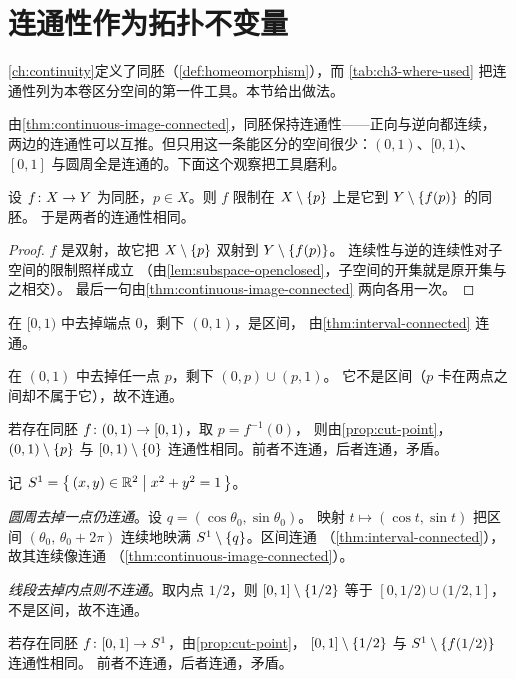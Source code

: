 \section{连通性作为拓扑不变量}
\label{sec:topological-invariant}

\cref{ch:continuity}定义了同胚（\cref{def:homeomorphism}），而%
\cref{tab:ch3-where-used} 把连通性列为本卷区分空间的第一件工具。本节给出做法。

由\cref{thm:continuous-image-connected}，同胚保持连通性——正向与逆向都连续，
两边的连通性可以互推。但只用这一条能区分的空间很少：\((0,1)\)、\([0,1)\)、
\([0,1]\) 与圆周全是连通的。下面这个观察把工具磨利。

\begin{proposition}[割点法]
  \label{prop:cut-point}
  设 \(f \colon X \to Y\) 为同胚，\(p \in X\)。则 \(f\) 限制在
  \(X \setminus \left\{p\right\}\) 上是它到 \(Y \setminus \left\{f(p)\right\}\) 的同胚。
  于是两者的连通性相同。
\end{proposition}

\begin{proof}
  \(f\) 是双射，故它把 \(X \setminus \left\{p\right\}\) 双射到 \(Y \setminus \left\{f(p)\right\}\)。
  连续性与逆的连续性对子空间的限制照样成立
  （由\cref{lem:subspace-openclosed}，子空间的开集就是原开集与之相交）。
  最后一句由\cref{thm:continuous-image-connected} 两向各用一次。
\end{proof}

\begin{example}[{\((0,1)\) 与 \([0,1)\) 不同胚}]
  \label{ex:01-not-homeo}
  \begin{worked}
    在 \([0,1)\) 中去掉端点 \(0\)，剩下 \((0,1)\)，是区间，
    由\cref{thm:interval-connected} 连通。

    在 \((0,1)\) 中去掉任一点 \(p\)，剩下 \((0,p) \cup (p,1)\)。
    它不是区间（\(p\) 卡在两点之间却不属于它），故不连通。

    若存在同胚 \(f \colon (0,1) \to [0,1)\)，取 \(p = f^{-1}(0)\)，
    则由\cref{prop:cut-point}，\((0,1) \setminus \left\{p\right\}\) 与 \([0,1) \setminus \left\{0\right\}\)
    连通性相同。前者不连通，后者连通，矛盾。
  \end{worked}
\end{example}

\begin{example}[{\([0,1]\) 与圆周不同胚}]
  \label{ex:circle-not-homeo}
  记 \(S^{1} = \left\{\,(x,y) \in \mathbb{R}^{2} \;\middle|\; x^{2}+y^{2}=1\,\right\}\)。
  \begin{worked}
    \emph{圆周去掉一点仍连通}。设 \(q = (\cos\theta_{0},\sin\theta_{0})\)。
    映射 \(t \mapsto (\cos t, \sin t)\) 把区间 \((\theta_{0},\,\theta_{0}+2\pi)\)
    连续地映满 \(S^{1} \setminus \left\{q\right\}\)。区间连通
    （\cref{thm:interval-connected}），故其连续像连通
    （\cref{thm:continuous-image-connected}）。

    \emph{线段去掉内点则不连通}。取内点 \(1/2\)，则
    \([0,1] \setminus \left\{1/2\right\}\) 等于 \([0,1/2) \cup (1/2,1]\)，
    不是区间，故不连通。

    若存在同胚 \(f \colon [0,1] \to S^{1}\)，由\cref{prop:cut-point}，
    \([0,1] \setminus \left\{1/2\right\}\) 与 \(S^{1} \setminus \left\{f(1/2)\right\}\) 连通性相同。
    前者不连通，后者连通，矛盾。
  \end{worked}
\end{example}

